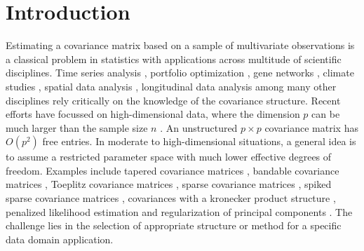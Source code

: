 \documentclass[11pt,oneside]{amsart}
\begin{document}
\section{Introduction}
Estimating a covariance matrix based on a sample of multivariate observations is a classical problem in statistics with applications across multitude of scientific disciplines. Time series analysis \citep{chen2013covariance,basu2015regularized}, portfolio optimization \citep{fan2008high,bai2011estimating}, gene networks \citep{butte2000discovering, schafer2005shrinkage}, climate studies \citep{houtekamer2001sequential, hamill2001distance, furrer2006covariance}, spatial data analysis \citep{kaufman2008covariance}, longitudinal data analysis \citep{smith2002parsimonious, wu2003nonparametric} among many other disciplines rely critically on the knowledge of the covariance structure. Recent efforts have focussed on high-dimensional data, where the dimension $p$ can be much larger than the sample size $n$ \citep{pourahmadi2011covariance,cai2016estimating,fan2016overview}. An unstructured $p \times p$ covariance matrix has $O(p^2)$ free entries. In moderate to high-dimensional situations, a general idea is to assume a restricted parameter space with much lower effective degrees of freedom. Examples include tapered covariance matrices \citep{furrer2007estimation}, bandable covariance matrices \citep{wu2003nonparametric,bickel2008regularized}, Toeplitz covariance matrices \citep{wu2009banding, mcmurry2010banded,xiao2012covariance}, sparse covariance matrices \citep{bickel2008covariance,karoui2008operator,karoui2008spectrum,rothman2009generalized,cai2011adaptive}, spiked sparse covariance matrices \citep{johnstone2001distribution, ma2013sparse, cai2015optimal}, covariances with a kronecker product structure \citep{werner2008estimation}, penalized likelihood estimation \citep{huang2006covariance,d2008first,lam2009sparsistency,ravikumar2011high} and regularization of principal components \citep{zou2006sparse,hoff2009hierarchical,johnstone2012consistency,cai2013sparse}. The challenge lies in the selection of appropriate structure or method for a specific data domain application. 
%
\end{document}
